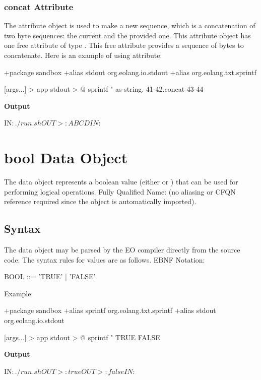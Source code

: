 \documentclass[12pt]{book}
\begin{document}
{\subsubsection{concat Attribute}
The  attribute object is used to make a new sequence, which is a concatenation of two byte sequences: the current and the provided one. This attribute object has one free attribute of type . This free attribute provides a sequence of bytes to concatenate. Here is an example of using  attribute:

\begin{ffcode}
+package sandbox
+alias stdout org.eolang.io.stdout
+alias org.eolang.txt.sprintf

[args...] > app
  stdout > @
    sprintf
      "%
      as-string.
        41-42.concat 43-44
\end{ffcode}
\textbf{Output}
\begin{ffcode}
IN$: ./run.sh
OUT>: ABCD
IN$:
\end{ffcode}

\section{bool Data Object} \label{sec:bool-data-type}
The  data object represents a boolean value (either  or ) that can be used for performing logical operations.
Fully Qualified Name:  (no aliasing or CFQN reference required since the object is automatically imported).

\subsection{Syntax}
The  data object may be parsed by the EO compiler directly from the source code. The syntax rules for  values are as follows. EBNF Notation:
\begin{ffcode}
BOOL     ::= 'TRUE'
           | 'FALSE'
\end{ffcode}
Example:
\begin{ffcode}
+package sandbox
+alias sprintf org.eolang.txt.sprintf
+alias stdout org.eolang.io.stdout

[args...] > app
  stdout > @
    sprintf
      "%
      TRUE
      FALSE
\end{ffcode}
\textbf{Output}
\begin{ffcode}
IN$: ./run.sh
OUT>: true
OUT>: false
IN$:
\end{ffcode}

}
\end{document}

